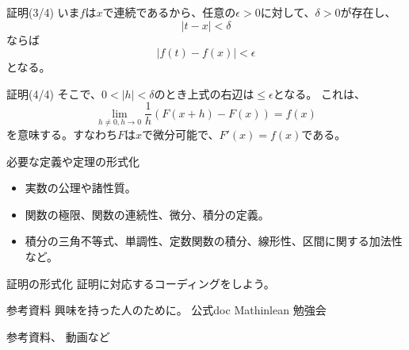 \documentclass[unicode,12pt]{beamer}%
\begin{document}
\begin{frame}{証明(3/4)}
  いま$f$は$x$で連続であるから、任意の$\epsilon>0$に対して、$\delta>0$が存在し、
  $$
  \lvert t-x\rvert<\delta
  $$
  ならば
  $$
  \lvert f(t)-f(x)\rvert<\epsilon
  $$
  となる。
\end{frame}

\begin{frame}{証明(4/4)}
  そこで、$0<\lvert h\rvert <\delta$のとき上式の右辺は$\leq\epsilon$となる。
  これは、
  $$
  \lim_{h\neq0,h\to0}\frac{1}{h}(F(x+h)-F(x))=f(x)
  $$
  を意味する。すなわち$F$は$x$で微分可能で、$F'(x)=f(x)$である。
\end{frame}

\begin{frame}{必要な定義や定理の形式化}
  \begin{itemize}
    \item 実数の公理や諸性質。
    \item 関数の極限、関数の連続性、微分、積分の定義。
    \item 積分の三角不等式、単調性、定数関数の積分、線形性、区間に関する加法性など。
  \end{itemize}
\end{frame}

\begin{frame}{証明の形式化}
  証明に対応するコーディングをしよう。
\end{frame}

\begin{frame}{参考資料}
  興味を持った人のために。
  公式doc
  Mathinlean
  勉強会


  参考資料、
  動画など
\end{frame}
\end{document}
